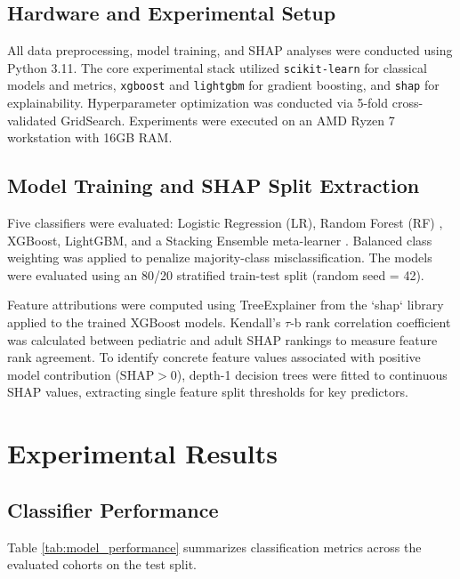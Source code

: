 \documentclass[conference]{IEEEtran}
\begin{document}
\subsection{Hardware and Experimental Setup}
All data preprocessing, model training, and SHAP analyses were conducted using Python 3.11. The core experimental stack utilized \texttt{scikit-learn} \cite{pedregosa2011} for classical models and metrics, \texttt{xgboost} \cite{chen2016} and \texttt{lightgbm} \cite{ke2017} for gradient boosting, and \texttt{shap} \cite{lundberg2017} for explainability. Hyperparameter optimization was conducted via 5-fold cross-validated GridSearch. Experiments were executed on an AMD Ryzen 7 workstation with 16GB RAM.

\subsection{Model Training and SHAP Split Extraction}
Five classifiers were evaluated: Logistic Regression (LR), Random Forest (RF) \cite{breiman2001}, XGBoost, LightGBM, and a Stacking Ensemble meta-learner \cite{wolpert1992}. Balanced class weighting was applied to penalize majority-class misclassification. The models were evaluated using an 80/20 stratified train-test split (random seed = 42).

Feature attributions were computed using TreeExplainer from the `shap` library \cite{lundberg2017} applied to the trained XGBoost models. Kendall's $\tau$-b rank correlation coefficient was calculated between pediatric and adult SHAP rankings to measure feature rank agreement. To identify concrete feature values associated with positive model contribution ($\text{SHAP} > 0$), depth-1 decision trees were fitted to continuous SHAP values, extracting single feature split thresholds for key predictors.

\section{Experimental Results}
\subsection{Classifier Performance}
Table \ref{tab:model_performance} summarizes classification metrics across the evaluated cohorts on the test split.
\end{document}
